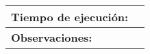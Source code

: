 \begin{longtable}{|l|l|}
\hline
\textbf{Tiempo de ejecución:}                                                                  &                                                                                                                                                                                                                                                                                                                                                                                                                                                                                            \\ 
\hline
\textbf{Observaciones:}                                                                        &                                                                                                                                                                                                                                                                                                             \\
\hline
\end{longtable}
